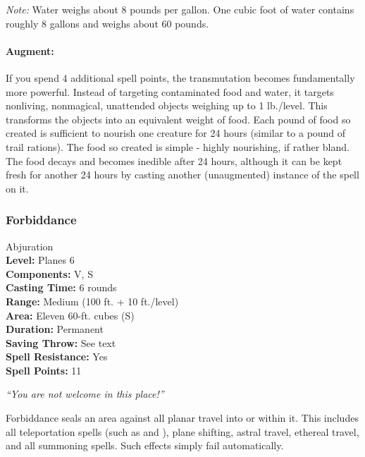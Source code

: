 \emph{Note:} Water weighs about 8 pounds per gallon. One cubic foot of water contains roughly 8 gallons and weighs about 60 pounds.

\paragraph{Augment:} If you spend 4 additional spell points, the transmutation becomes fundamentally more powerful. Instead of targeting contaminated food and water, it targets nonliving, nonmagical, unattended objects weighing up to 1 lb./level. This transforms the objects into an equivalent weight of food. Each pound of food so created is sufficient to nourish one creature for 24 hours (similar to a pound of trail rations). 
The food so created is simple - highly nourishing, if rather bland.
The food decays and becomes inedible after 24 hours, although it can be kept fresh for another 24 hours by casting another (unaugmented) instance of the spell on it.

\subsubsection{Forbiddance}
\label{Spell:Forbiddance}
Abjuration
\\ \textbf{Level:} Planes 6
\\ \textbf{Components:} V, S
\\ \textbf{Casting Time:} 6 rounds
\\ \textbf{Range:} Medium (100 ft. + 10 ft./level)
\\ \textbf{Area:} Eleven 60-ft. cubes (S)
\\ \textbf{Duration:} Permanent
\\ \textbf{Saving Throw:} See text
\\ \textbf{Spell Resistance:} Yes
\\ \textbf{Spell Points:} 11

\emph{``You are not welcome in this place!''}

Forbiddance seals an area against all planar travel into or within it. 
This includes all teleportation spells (such as  and ), plane shifting, astral travel, ethereal travel, and all summoning spells. 
Such effects simply fail automatically.

